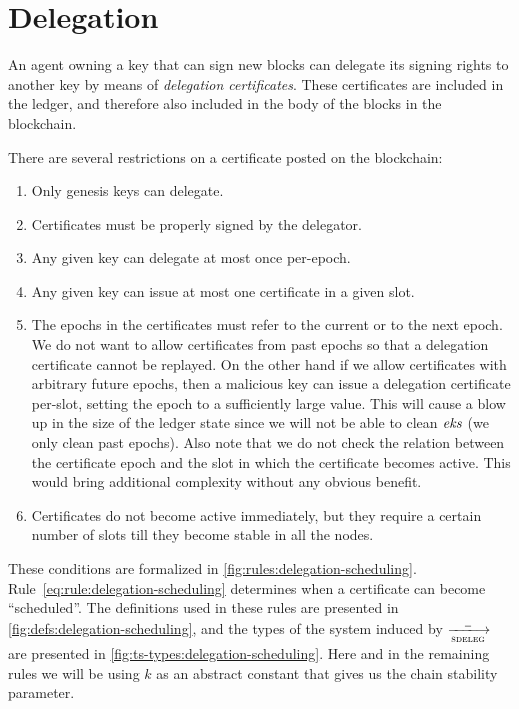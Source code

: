 \section{Delegation}
\label{sec:delegation}

An agent owning a key that can sign new blocks can delegate its signing rights
to another key by means of \textit{delegation certificates}. These certificates
are included in the ledger, and therefore also included in the body of the
blocks in the blockchain.

There are several restrictions on a certificate posted on the blockchain:
\begin{enumerate}
\item Only genesis keys can delegate.
\item Certificates must be properly signed by the delegator.
\item Any given key can delegate at most once per-epoch.
\item Any given key can issue at most one certificate in a given slot.
\item The epochs in the certificates must refer to the current or to the next
  epoch. We do not want to allow certificates from past epochs so that a
  delegation certificate cannot be replayed. On the other hand if we allow
  certificates with arbitrary future epochs, then a malicious key can issue a
  delegation certificate per-slot, setting the epoch to a sufficiently large
  value. This will cause a blow up in the size of the ledger state since we
  will not be able to clean $\mathit{eks}$ (we only clean past epochs). Also note
  that we do not check the relation between the certificate epoch and the slot
  in which the certificate becomes active. This would bring additional
  complexity without any obvious benefit.
\item Certificates do not become active immediately, but they require a certain
  number of slots till they become stable in all the nodes.
\end{enumerate}
These conditions are formalized in \cref{fig:rules:delegation-scheduling}.
Rule~\ref{eq:rule:delegation-scheduling} determines when a certificate can
become ``scheduled''. The definitions used in these rules are presented in
\cref{fig:defs:delegation-scheduling}, and the types of the system induced by
$\trans{sdeleg}{\wcard}$ are presented in
\cref{fig:ts-types:delegation-scheduling}. Here and in the remaining rules we
will be using $k$ as an abstract constant that gives us the chain stability
parameter.

